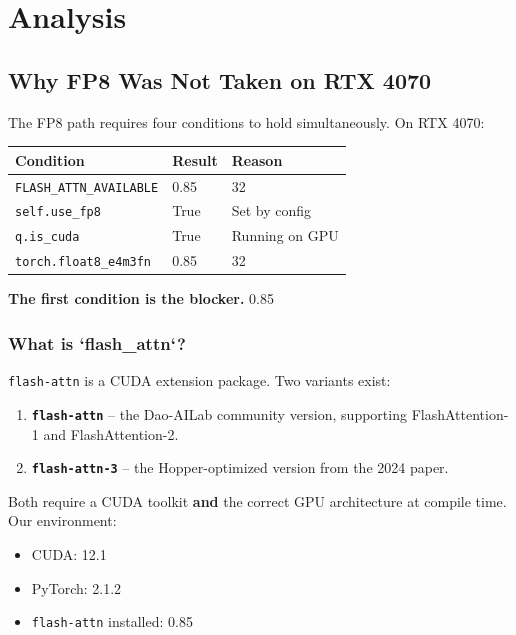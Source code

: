 
\section{Analysis}

\subsection{Why FP8 Was Not Taken on RTX 4070}

The FP8 path requires four conditions to hold simultaneously. On RTX 4070:

\begin{table}[H]
\centering
\small
\begin{tabular}{lll}
\toprule
\textbf{Condition} & \textbf{Result} & \textbf{Reason} \\
\midrule
\texttt{FLASH\_ATTN\_AVAILABLE} & 0.85 & 32 \\
\texttt{self.use\_fp8} & True & Set by config \\
\texttt{q.is\_cuda} & True & Running on GPU \\
\texttt{torch.float8\_e4m3fn} & 0.85 & 32 \\
\bottomrule
\end{tabular}
\end{table}

\textbf{The first condition is the blocker.} 0.85

\subsubsection{What is `flash\_attn`?}

\texttt{flash-attn} is a CUDA extension package. Two variants exist:

\begin{enumerate}
\item \textbf{\texttt{flash-attn}} -- the Dao-AILab community version, supporting
  FlashAttention-1 and FlashAttention-2.
\item \textbf{\texttt{flash-attn-3}} -- the Hopper-optimized version from the 2024 paper.

\end{enumerate}
Both require a CUDA toolkit \textbf{and} the correct GPU architecture at compile 
time. Our environment:

\begin{itemize}
\item CUDA: 12.1
\item PyTorch: 2.1.2
\item \texttt{flash-attn} installed: 0.85

\end{itemize}
